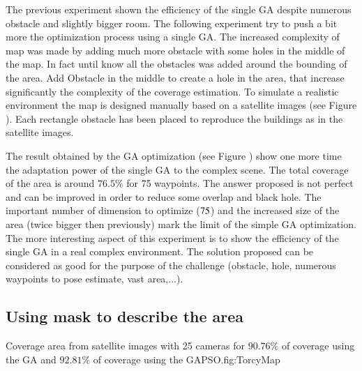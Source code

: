The previous experiment shown the efficiency of the single GA despite numerous obstacle and slightly bigger room. The following experiment try to push a bit more the optimization process using a single GA. The increased complexity of map was made by adding much more obstacle with some holes in the middle of the map. In fact until know all the obstacles was added around the bounding of the area. Add Obstacle in the middle to create a hole in the area, that increase significantly the complexity of the coverage estimation.
To simulate a realistic environment the map is designed manually based on a satellite images (see Figure ). Each rectangle obstacle has been placed to reproduce the buildings as in  the satellite images. 

The result obtained by the GA optimization (see Figure ) show one more time the adaptation power of the single GA to the complex scene. The total coverage of the area is around $76.5\%$ for 75 waypoints. The answer proposed is not perfect and can be improved in order to reduce some overlap and black hole. The important number of dimension to optimize ($75\time 4$) and the increased size of the area (twice bigger then previously) mark the limit of the simple GA optimization.\\
	The more interesting aspect of this experiment is to show the efficiency of the single GA in a real complex environment. The solution proposed can be considered as good for the purpose of the challenge (obstacle, hole, numerous waypoints to pose estimate, vast area,...). 
  

	
	\subsection{Using mask to describe the area }\label{sec:maskGAPSO}

\begin{mfigures}[!]
{Coverage area from satellite images with 25 cameras for $90.76\%$ of coverage using the GA and $92.81\%$ of coverage using the GAPSO.}{fig:TorcyMap} \centering
{}
\hspace{1cm}
\hspace{1cm}
\tabsimuposeTorcy
\end{mfigures}


